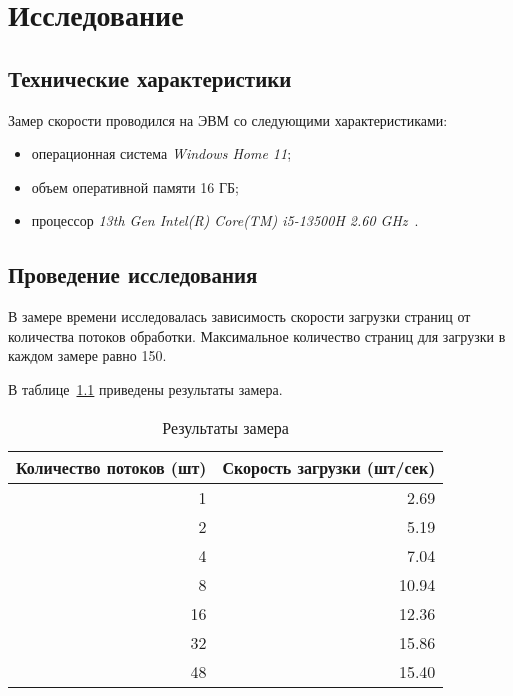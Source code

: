 \chapter{Исследование}

\section{Технические характеристики}

Замер скорости проводился на ЭВМ со следующими характеристиками:
\begin{itemize}[label=--]
    \item операционная система \textit{Windows Home 11};
    \item объем оперативной памяти 16 ГБ;
    \item процессор \textit{13th Gen Intel(R) Core(TM) i5-13500H 2.60 GHz}~\cite{processor}.
\end{itemize}

\section{Проведение исследования}

В замере времени исследовалась зависимость скорости загрузки страниц от количества потоков обработки. Максимальное количество страниц для загрузки в каждом замере равно 150.

В таблице~\ref{tbl:bench} приведены результаты замера.

\begin{table}[ht]
    \small
    \begin{center}
        \begin{threeparttable}
            \caption{Результаты замера}
            \label{tbl:bench}
            \begin{tabular}{|r|r|}
                \hline
                \textbf{Количество потоков (шт)} & \textbf{Скорость загрузки (шт/сек)}  \\
                \hline
                1 & 2.69 \\
                \hline
                2 & 5.19 \\
                \hline
                4 & 7.04 \\
                \hline
                8 & 10.94 \\
                \hline
                16 & 12.36 \\
                \hline
                32 & 15.86 \\
                \hline
                48 & 15.40 \\
                \hline
            \end{tabular}
        \end{threeparttable}
    \end{center}
\end{table}

